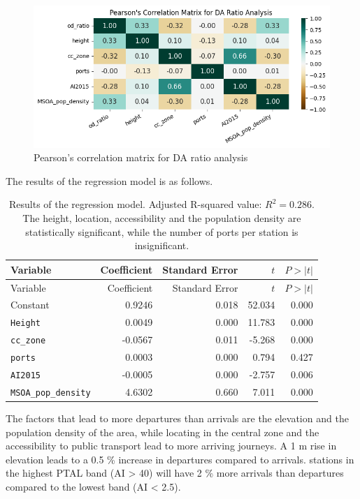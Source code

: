 \documentclass[
  12pt,
  a4paper,
  DIV=11,
  numbers=noendperiod]{scrartcl}
\begin{document}
\begin{figure}

{\centering \includegraphics{img/cor_matrix_DA.png}

}

\caption{Pearson's correlation matrix for DA ratio analysis}

\end{figure}

The results of the regression model is as follows.

\begin{longtable}[]{@{}lrrrr@{}}
\caption{Results of the regression model. Adjusted R-squared value:
\(R^2 = 0.286\). The height, location, accessibility and the population
density are statistically significant, while the number of ports per
station is insignificant.}\tabularnewline
\toprule\noalign{}
Variable & Coefficient & Standard Error & \(t\) & \(P > |t|\) \\
\midrule\noalign{}
\endfirsthead
\toprule\noalign{}
Variable & Coefficient & Standard Error & \(t\) & \(P > |t|\) \\
\midrule\noalign{}
\endhead
\bottomrule\noalign{}
\endlastfoot
Constant & 0.9246 & 0.018 & 52.034 & 0.000 \\
\texttt{Height} & 0.0049 & 0.000 & 11.783 & 0.000 \\
\texttt{cc\_zone} & -0.0567 & 0.011 & -5.268 & 0.000 \\
\texttt{ports} & 0.0003 & 0.000 & 0.794 & 0.427 \\
\texttt{AI2015} & -0.0005 & 0.000 & -2.757 & 0.006 \\
\texttt{MSOA\_pop\_density} & 4.6302 & 0.660 & 7.011 & 0.000 \\
\end{longtable}

The factors that lead to more departures than arrivals are the elevation
and the population density of the area, while locating in the central
zone and the accessibility to public transport lead to more arriving
journeys. A 1 m rise in elevation leads to a 0.5 \% increase in
departures compared to arrivals. stations in the highest PTAL band (AI
\textgreater{} 40) will have 2 \% more arrivals than departures compared
to the lowest band (AI \textless{} 2.5).
\end{document}
